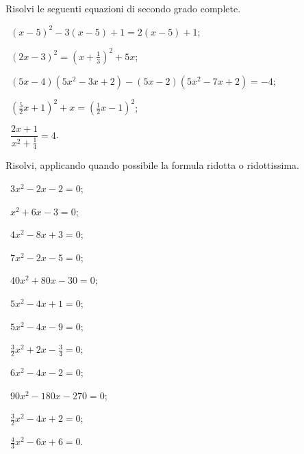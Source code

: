 \begin{esercizio}[\Ast]
 \label{ese:3.13} %
Risolvi le seguenti equazioni di secondo grado complete.
 \begin{enumeratea}
 \item~$(x-5)^{2}-3(x - 5)+1 = 2(x-5)+1$;
 \item~$(2x - 3)^{2} = \left(x+\frac{1}{3}\right)^{2}+5x$;
 \item~$(5x-4)\left(5x^{2}-3x+2\right)-(5x-2)\left(5x^{2}-7x+2\right) = -4$;
 \item~$\left(\frac{5}{2}x+1\right)^{2}+x=\left(\frac{1}{2}x-1\right)^{2}$;
 \item~$\dfrac{2x+1}{x^{2}+\frac{1}{4}}=4$.
 \end{enumeratea}
\end{esercizio}

\begin{esercizio}[\Ast]
\label{ese:3.14}
Risolvi, applicando quando possibile la formula ridotta o ridottissima.
\begin{multicols}{2}
 \begin{enumeratea}
 \item~$3 x^{2}-2 x-2 = 0$;
 \item~$x^{2} + 6 x-3 = 0$;
 \item~$4 x^{2}-8 x + 3 = 0$;
 \item~$7 x^{2}-2 x-5 = 0$;
 \item~$40 x^{2} + 80 x-30 = 0$;
 \item~$5 x^{2}-4 x + 1 = 0$;
 \item~$5 x^{2}-4 x-9 = 0$;
 \item~$\frac{3}{2} x^{2} + 2 x-\frac{3}{4} = 0$;
 \item~$6 x^{2}-4 x-2 = 0$;
 \item~$90 x^{2}-180 x-270 = 0$;
 \item~$\frac{3}{2} x^{2}-4 x + 2 = 0$;
 \item~$\frac{4}{3} x^{2}-6 x + 6 = 0$.
 \end{enumeratea}
 \end{multicols}
\end{esercizio}

